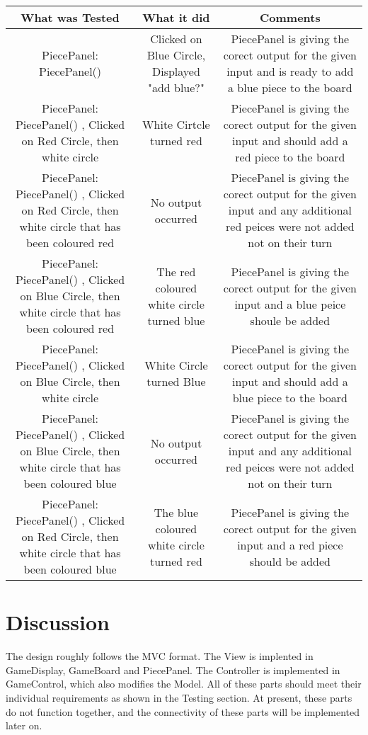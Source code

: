 \documentclass[12pt]{article}
\begin{document}
	\begin{tabularx}{\linewidth}{|C|C|C|}
		What was Tested & What it did & Comments \\
		\hline 
		PiecePanel: PiecePanel() &  Clicked on Blue Circle, Displayed "add blue?" & PiecePanel is giving the corect output for the given input and is ready to add a blue piece to the board \\
		PiecePanel: PiecePanel()  , Clicked on Red Circle, then white circle & White Cirtcle turned red & PiecePanel is giving the corect output for the given input and should add a red piece to the board \\
		PiecePanel: PiecePanel()  , Clicked on Red Circle, then white circle that has been coloured red & No output occurred & PiecePanel is giving the corect output for the given input and any additional red peices were not added not on their turn \\
		PiecePanel: PiecePanel()  , Clicked on Blue Circle, then white circle that has been coloured red & The red coloured white circle turned blue & PiecePanel is giving the corect output for the given input and a blue peice shoule be added \\
		PiecePanel: PiecePanel()  , Clicked on Blue Circle, then white circle & White Circle turned Blue & PiecePanel is giving the corect output for the given input and should add a blue piece to the board \\
		PiecePanel: PiecePanel()  , Clicked on Blue Circle, then white circle that has been coloured blue & No output occurred & PiecePanel is giving the corect output for the given input and any additional red peices were not added not on their turn \\
		PiecePanel: PiecePanel()  , Clicked on Red Circle, then white circle that has been coloured blue & The blue coloured white circle turned red & PiecePanel is giving the corect output for the given input and a red piece should be added \\
	\end{tabularx}
	\section{Discussion}
	The design roughly follows the MVC format. The View is implented in GameDisplay, GameBoard and PiecePanel. The Controller is implemented in GameControl, which also modifies the Model. All of these parts should meet their individual requirements as shown in the Testing section.
	At present, these parts do not function together, and the connectivity of these parts will be implemented later on.
\end{document}
